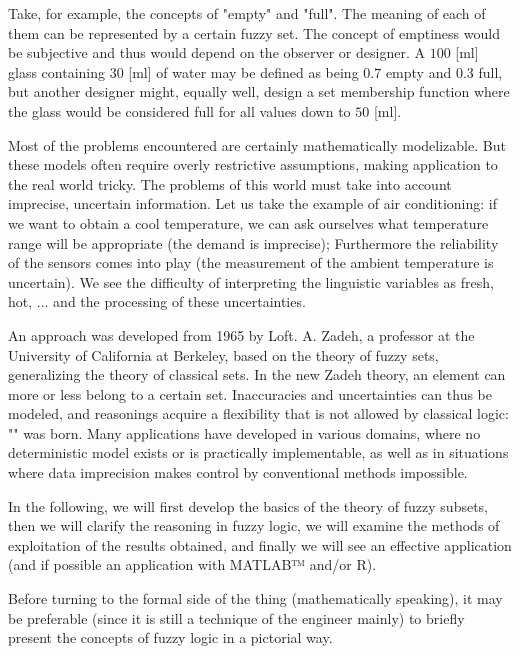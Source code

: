 	Take, for example, the concepts of "empty" and "full". The meaning of each of them can be represented by a certain fuzzy set. The concept of emptiness would be subjective and thus would depend on the observer or designer. A $100$ [ml] glass containing $30$ [ml] of water may be defined as being $0.7$ empty and $0.3$ full, but another designer might, equally well, design a set membership function where the glass would be considered full for all values down to $50$ [ml].
	
	Most of the problems encountered are certainly mathematically modelizable. But these models often require overly restrictive assumptions, making application to the real world tricky. The problems of this world must take into account imprecise, uncertain information. Let us take the example of air conditioning: if we want to obtain a cool temperature, we can ask ourselves what temperature range will be appropriate (the demand is imprecise); Furthermore the reliability of the sensors comes into play (the measurement of the ambient temperature is uncertain). We see the difficulty of interpreting the linguistic variables as fresh, hot, ... and the processing of these uncertainties.
	
	An approach was developed from 1965 by Loft. A. Zadeh, a professor at the University of California at Berkeley, based on the theory of fuzzy sets, generalizing the theory of classical sets. In the new Zadeh theory, an element can more or less belong to a certain set. Inaccuracies and uncertainties can thus be modeled, and reasonings acquire a flexibility that is not allowed by classical logic: "" was born. Many applications have developed in various domains, where no deterministic model exists or is practically implementable, as well as in situations where data imprecision makes control by conventional methods impossible.

	In the following, we will first develop the basics of the theory of fuzzy subsets, then we will clarify the reasoning in fuzzy logic, we will examine the methods of exploitation of the results obtained, and finally we will see an effective application (and if possible an application with MATLAB™ and/or R).

	Before turning to the formal side of the thing (mathematically speaking), it may be preferable (since it is still a technique of the engineer mainly) to briefly present the concepts of fuzzy logic in a pictorial way.
	
